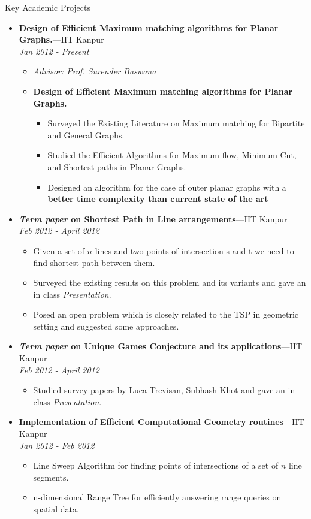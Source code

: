 \documentclass[10pt]{article}
\newenvironment{ressection}[1]{
	\vspace{4pt}
	{\fontfamily{phv}\selectfont\Large#1}
	\begin{itemize}
	\vspace{3pt}
}{
	\end{itemize}
}
\newcommand{\resitem}[1]{
	\vspace{-4pt}
	\item \begin{flushleft} #1 \end{flushleft}
}
\newcommand{\ressubitem}[1]{
	\vspace{-1pt}
	\item \begin{flushleft} #1 \end{flushleft}
}
\newcommand{\resbigitem}[3]{
	\vspace{-5pt}
	\item
	\textbf{#1}---#2 \\
	\textit{#3}
}
\newenvironment{ressubsec}[3]{
	\resbigitem{#1}{#2}{#3}
	\vspace{-2pt}
	\begin{itemize}
}{
	\end{itemize}
}
\newenvironment{reslist}[1]{
	\resitem{\textbf{#1}}
	\vspace{-5pt}
	\begin{itemize}
}{
	\end{itemize}
}
\begin{document}
\begin{ressection}{Key Academic Projects}

  \begin{ressubsec}{Design of Efficient Maximum matching algorithms for Planar Graphs.}{IIT Kanpur}{Jan 2012 - Present}
  
  \ressubitem{\textit{Advisor: Prof. Surender Baswana}}
  \begin{reslist}{Design of Efficient Maximum matching algorithms for Planar Graphs.}
     \ressubitem{Surveyed the Existing Literature on Maximum matching for Bipartite and General Graphs.}
     \ressubitem{Studied the Efficient Algorithms for Maximum flow, Minimum Cut, and Shortest paths in Planar Graphs.}
     \ressubitem{Designed an algorithm for the case of outer planar graphs with a \textbf{better time complexity than current state of the art}}
  \end{reslist}
  \end{ressubsec}
  
  \begin{ressubsec}{\textit{Term paper} on Shortest Path in Line arrangements}{IIT Kanpur}{Feb 2012 - April 2012}
   \ressubitem{Given a set of $n$ lines and two points of intersection s and t we need to find shortest path between them.}
   \ressubitem{Surveyed the existing results on this problem and its variants and gave an in class \emph{Presentation}.}
   \ressubitem{Posed an open problem which is closely related to the TSP in geometric setting and suggested some approaches. }
  \end{ressubsec}


  \begin{ressubsec}{\textit{Term paper} on Unique Games Conjecture and its applications}{IIT Kanpur}{Feb 2012 - April 2012}
   \ressubitem{Studied survey papers by Luca Trevisan, Subhash Khot and gave an in class \emph{Presentation}.}
  \end{ressubsec}

  \begin{ressubsec}{Implementation of Efficient Computational Geometry routines}{IIT Kanpur}{Jan 2012 - Feb 2012}
   \ressubitem{Line Sweep Algorithm for finding points of intersections of a set of $n$ line segments.}
   \ressubitem{n-dimensional Range Tree for efficiently answering range queries on spatial data.}
  \end{ressubsec}


\end{ressection}
\end{document}
